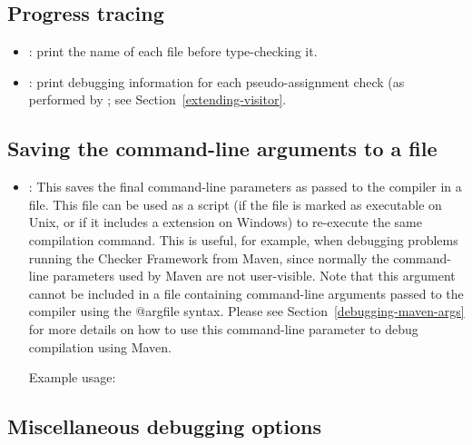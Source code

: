 \subsection{Progress tracing\label{debugging-options-progress}}

\begin{itemize}

\item {}: print the name of each file before type-checking it.

\item {}: print debugging information for each
pseudo-assignment check (as performed by
; see
Section~\ref{extending-visitor}.

\end{itemize}

\subsection{Saving the command-line arguments to a file\label{debugging-options-output-args}}

\begin{itemize}

\item {}:
  This saves the final command-line parameters as passed to the compiler in a file.
  This file can be used as a script (if the file is marked as executable on Unix, or
  if it includes a  extension on Windows) to re-execute the same compilation command.
  This is useful, for example, when debugging problems running the Checker Framework from
  Maven, since normally the command-line parameters used by Maven are not user-visible.
  Note that this argument cannot be included in a file containing command-line arguments
  passed to the compiler using the @argfile syntax.  Please see
  Section~\ref{debugging-maven-args} for more details on how to use this command-line
  parameter to debug compilation using Maven.

  Example usage: 

\end{itemize}

\subsection{Miscellaneous debugging options\label{debugging-options-misc}}


